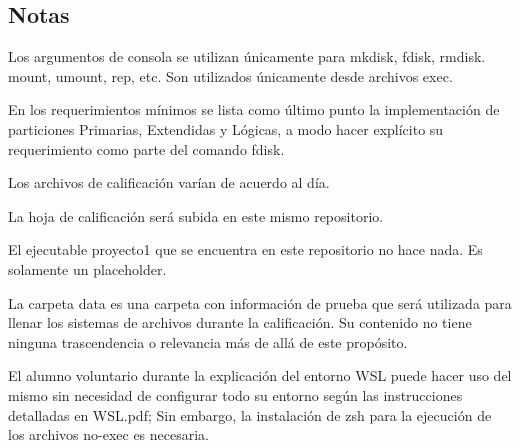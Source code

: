 \subsection*{Notas}


\begin{DoxyItemize}
\item Los argumentos de consola se utilizan únicamente para mkdisk, fdisk, rmdisk. mount, umount, rep, etc. Son utilizados únicamente desde archivos exec.
\item En los requerimientos mínimos se lista como último punto la implementación de particiones Primarias, Extendidas y Lógicas, a modo hacer explícito su requerimiento como parte del comando fdisk.
\item Los archivos de calificación varían de acuerdo al día.
\item La hoja de calificación será subida en este mismo repositorio.
\item El ejecutable {\ttfamily proyecto1} que se encuentra en este repositorio no hace nada. Es solamente un placeholder.
\item La carpeta {\ttfamily data} es una carpeta con información de prueba que será utilizada para llenar los sistemas de archivos durante la calificación. Su contenido no tiene ninguna trascendencia o relevancia más de allá de este propósito.
\item El alumno voluntario durante la explicación del entorno W\+SL puede hacer uso del mismo sin necesidad de configurar todo su entorno según las instrucciones detalladas en W\+S\+L.\+pdf; Sin embargo, la instalación de zsh para la ejecución de los archivos no-\/exec es necesaria. 
\end{DoxyItemize}